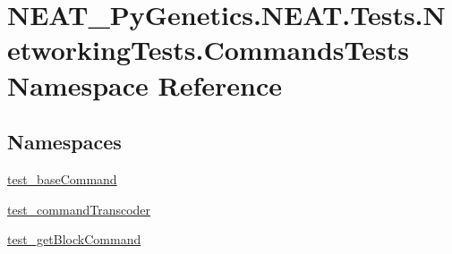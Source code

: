 \hypertarget{namespaceNEAT__PyGenetics_1_1NEAT_1_1Tests_1_1NetworkingTests_1_1CommandsTests}{}\section{N\+E\+A\+T\+\_\+\+Py\+Genetics.\+N\+E\+A\+T.\+Tests.\+Networking\+Tests.\+Commands\+Tests Namespace Reference}
\label{namespaceNEAT__PyGenetics_1_1NEAT_1_1Tests_1_1NetworkingTests_1_1CommandsTests}
\subsection*{Namespaces}
\begin{DoxyCompactItemize}
\item 
 \hyperlink{namespaceNEAT__PyGenetics_1_1NEAT_1_1Tests_1_1NetworkingTests_1_1CommandsTests_1_1test__baseCommand}{test\+\_\+base\+Command}
\item 
 \hyperlink{namespaceNEAT__PyGenetics_1_1NEAT_1_1Tests_1_1NetworkingTests_1_1CommandsTests_1_1test__commandTranscoder}{test\+\_\+command\+Transcoder}
\item 
 \hyperlink{namespaceNEAT__PyGenetics_1_1NEAT_1_1Tests_1_1NetworkingTests_1_1CommandsTests_1_1test__getBlockCommand}{test\+\_\+get\+Block\+Command}
\end{DoxyCompactItemize}

